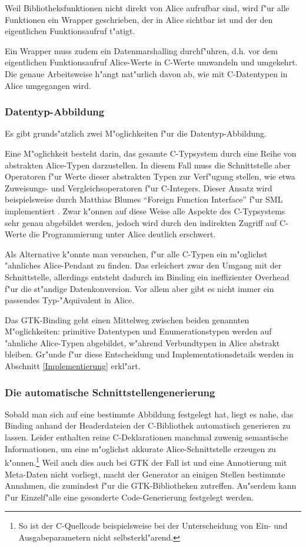 \documentclass[a4paper,titlepage]{article}
\begin{document}
Weil Bibliotheksfunktionen nicht direkt von Alice aufrufbar sind,
wird f"ur alle Funktionen ein Wrapper geschrieben, der in Alice
sichtbar ist und der den eigentlichen Funktionsaufruf t"atigt.

Ein Wrapper muss zudem ein Datenmarshalling durchf"uhren, d.h. vor
dem eigentlichen Funktionsaufruf Alice-Werte in C-Werte umwandeln und
umgekehrt. Die genaue Arbeitsweise h"angt nat"urlich davon ab, wie mit
C-Datentypen in Alice umgegangen wird.

\subsubsection*{Datentyp-Abbildung}

Es gibt grunds"atzlich zwei M"oglichkeiten f"ur die Datentyp-Abbildung.

Eine M"oglichkeit besteht darin, das gesamte C-Typsystem durch eine Reihe von
abstrakten Alice-Typen darzustellen. In diesem Fall muss die Schnittstelle
aber Operatoren f"ur Werte dieser abstrakten Typen zur Verf"ugung stellen,
wie etwa Zuweisungs- und Vergleichsoperatoren f"ur C-Integers.
Dieser Ansatz wird beispielsweise durch Matthias Blumes
``Foreign Function Interface'' f"ur SML implementiert \cite{blume}.
Zwar k"onnen auf diese Weise alle Aspekte des C-Typsystems sehr genau
abgebildet werden, jedoch wird durch den indirekten Zugriff auf C-Werte die
Programmierung unter Alice deutlich erschwert.

Als Alternative k"onnte man versuchen, f"ur alle C-Typen ein m"oglichst
"ahnliches Alice-Pendant zu finden. Das erleichert zwar den Umgang mit
der Schnittstelle, allerdings entsteht
dadurch im Binding ein ineffizienter Overhead f"ur die st"andige
Datenkonversion. Vor allem aber gibt es nicht immer
ein passendes Typ-"Aquivalent in Alice.

Das GTK-Binding geht einen Mittelweg zwischen beiden genannten M"oglichkeiten:
primitive Datentypen und Enumerationstypen werden auf "ahnliche Alice-Typen
abgebildet, w"ahrend Verbundtypen in Alice abstrakt bleiben.
Gr"unde f"ur diese Entscheidung und Implementationsdetails werden in Abschnitt
\ref{Implementierung} erkl"art.

\subsubsection*{Die automatische Schnittstellengenerierung}

Sobald man sich auf eine bestimmte Abbildung festgelegt hat, liegt es nahe,
das Binding anhand der Headerdateien der C-Bibliothek automatisch generieren zu
lassen. Leider enthalten reine C-Deklarationen manchmal zuwenig semantische
Informationen, um eine m"oglichst akkurate Alice-Schnittstelle erzeugen
zu k"onnen.\footnote{So ist der C-Quellcode beispielsweise bei der
Unterscheidung von Ein- und Ausgabeparametern nicht selbsterkl"arend.} 
Weil auch dies auch bei GTK der Fall
ist und eine Annotierung mit Meta-Daten nicht vorliegt, macht der Generator
an einigen Stellen bestimmte Annahmen, die zumindest f"ur die GTK-Bibliotheken
zutreffen. Au"serdem kann f"ur Einzelf"alle eine gesonderte Code-Generierung
festgelegt werden.
\end{document}
